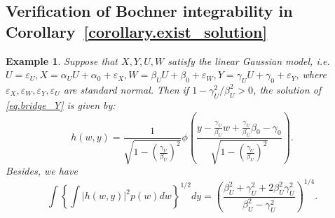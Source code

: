 \documentclass[
  12pt]{article}
\newtheorem{example}{Example}
\begin{document}
\subsection{Verification of Bochner integrability in Corollary~\ref{corollary.exist_solution}}\label{appx.Bochner}

\begin{example}\label{exm.linear2}
Suppose that $X, Y, U, W$ satisfy the linear Gaussian model, \emph{i.e.} $U=\varepsilon_U,X =\alpha_U U + \alpha_0+\varepsilon_X,W =\beta_U U +\beta_0 + \varepsilon_W, Y=\gamma_U U + \gamma_0 +\varepsilon_Y$, where $\varepsilon_X, \varepsilon_W, \varepsilon_Y, \varepsilon_U$ are standard normal. Then if $1-\gamma_U^2/\beta_U^2>0$, the solution of \eqref{eq.bridge_Y} is given by:
$$
h(w,y)=\frac{1}{\sqrt{1-\left( \frac{\gamma_U}{\beta_U} \right)^2}}\phi \left( \frac{y-\frac{\gamma_U}{\beta_U}w+\frac{\gamma_U}{\beta_U}\beta_0-\gamma_0}{\sqrt{1-\left( \frac{\gamma_U}{\beta_U} \right)^2}} \right). 
$$
Besides, we have
$$
\int \left\{\int |h(w,y)|^2 p(w) dw\right\}^{1/2} dy =\left(\frac{\beta_U^2+\gamma_U^2+2\beta_U^2\gamma_U^2}{\beta_U^2-\gamma_U^2}\right)^{1/4}.
$$
\end{example}
\end{document}
